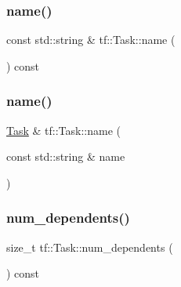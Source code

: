 \mbox{\label{classtf_1_1Task_a08ada0425b490997b6ff7f310107e5e3}} 
\subsubsection{\texorpdfstring{name()}{name()}\hspace{0.1cm}{\footnotesize\ttfamily [1/2]}}
{\footnotesize\ttfamily const std\+::string \& tf\+::\+Task\+::name (\begin{DoxyParamCaption}{ }\end{DoxyParamCaption}) const\hspace{0.3cm}{\ttfamily [inline]}}

\mbox{\label{classtf_1_1Task_a2d3d62a1809d708137763db8e2a8dde8}} 
\subsubsection{\texorpdfstring{name()}{name()}\hspace{0.1cm}{\footnotesize\ttfamily [2/2]}}
{\footnotesize\ttfamily \hyperlink{classtf_1_1Task}{Task} \& tf\+::\+Task\+::name (\begin{DoxyParamCaption}\item[{const std\+::string \&}]{name }\end{DoxyParamCaption})\hspace{0.3cm}{\ttfamily [inline]}}

\mbox{\label{classtf_1_1Task_a974dc1d738b62b829ad261beeafbd67c}} 
\subsubsection{\texorpdfstring{num\+\_\+dependents()}{num\_dependents()}}
{\footnotesize\ttfamily size\+\_\+t tf\+::\+Task\+::num\+\_\+dependents (\begin{DoxyParamCaption}{ }\end{DoxyParamCaption}) const\hspace{0.3cm}{\ttfamily [inline]}}


